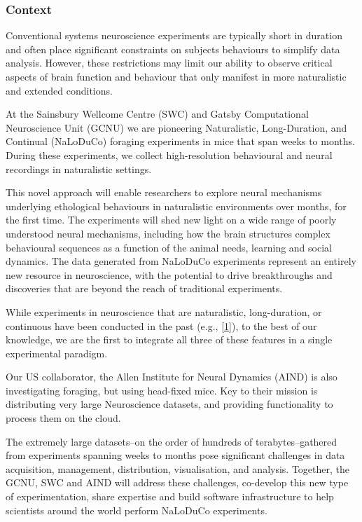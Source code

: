 \subsubsection{Context}

Conventional systems neuroscience experiments are typically short in duration
and often place significant constraints on subjects behaviours to simplify data
analysis.
%
However, these restrictions may limit our ability to observe critical
aspects of brain function and behaviour that only manifest in more naturalistic
and extended conditions.

At the Sainsbury Wellcome Centre (SWC) and Gatsby Computational Neuroscience
Unit (GCNU) we are pioneering Naturalistic, Long-Duration, and Continual
(NaLoDuCo) foraging experiments in mice that span weeks to months. During these
experiments, we collect high-resolution behavioural and neural recordings in
naturalistic settings.

This novel  approach will enable researchers to explore neural mechanisms
underlying ethological behaviours in naturalistic environments over months, for
the first time.  The experiments will shed new light on a wide range of poorly
understood neural mechanisms, including how the brain structures complex
behavioural sequences as a function of the animal needs, learning and social
dynamics.
%
The data generated from NaLoDuCo experiments represent an entirely new resource
in neuroscience, with the potential to drive breakthroughs and discoveries that
are beyond the reach of traditional experiments.

While experiments in neuroscience that are naturalistic, long-duration, or
continuous have been conducted in the past
(e.g., [\href{https://pubmed.ncbi.nlm.nih.gov/37656619/}{1}]), to the best of our
knowledge, we are the first to integrate all three of these features in a
single experimental paradigm.

Our US collaborator, the Allen Institute for Neural Dynamics (AIND) is also investigating
foraging, but using head-fixed mice. Key to their mission is distributing very large Neuroscience datasets,
and providing functionality to process them on the cloud.


The extremely large datasets--on the order of hundreds of terabytes--gathered
from experiments spanning weeks to months pose significant challenges in data
acquisition, management, distribution, visualisation, and analysis.
%
Together, the GCNU, SWC and AIND will address these challenges, co-develop this
new type of experimentation, share expertise and build software infrastructure
to help scientists around the world perform NaLoDuCo experiments.

